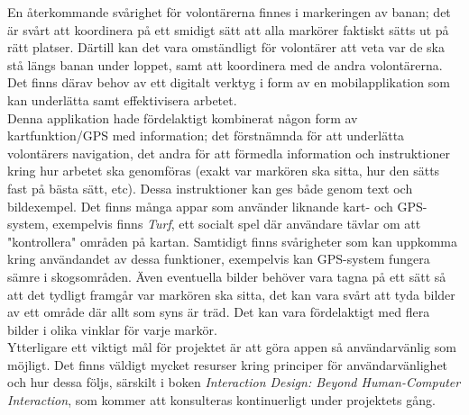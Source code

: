 En återkommande svårighet för volontärerna finnes i markeringen av banan; det är svårt att koordinera på ett smidigt sätt att alla markörer faktiskt sätts ut på rätt platser. Därtill kan det vara omständligt för volontärer att veta var de ska stå längs banan under loppet, samt att koordinera med de andra volontärerna. Det finns därav behov av ett digitalt verktyg i form av en mobilapplikation som kan underlätta samt effektivisera arbetet.\\

\noindent Denna applikation hade fördelaktigt kombinerat någon form av kartfunktion/GPS med information; det förstnämnda för att underlätta volontärers navigation, det andra för att förmedla information och instruktioner kring hur arbetet ska genomföras (exakt var markören ska sitta, hur den sätts fast på bästa sätt, etc). Dessa instruktioner kan ges både genom text och bildexempel. Det finns många appar som använder liknande kart- och GPS-system, exempelvis finns \textit{Turf}\cite{turf}, ett socialt spel där användare tävlar om att "kontrollera" områden på kartan. Samtidigt finns svårigheter som kan uppkomma kring användandet av dessa funktioner, exempelvis kan GPS-system fungera sämre i skogsområden. Även eventuella bilder behöver vara tagna på ett sätt så att det tydligt framgår var markören ska sitta, det kan vara svårt att tyda bilder av ett område där allt som syns är träd. Det kan vara fördelaktigt med flera bilder i olika vinklar för varje markör. \\

\noindent Ytterligare ett viktigt mål för projektet är att göra appen så användarvänlig som möjligt. Det finns väldigt mycket resurser kring principer för användarvänlighet och hur dessa följs, särskilt i boken \textit{Interaction Design: Beyond Human-Computer Interaction}\cite{preece2015interaction}, som kommer att konsulteras kontinuerligt under projektets gång. 

